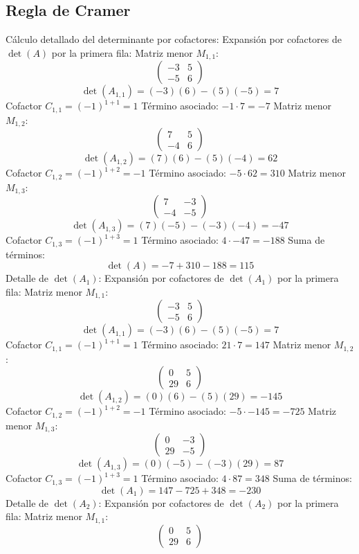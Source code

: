 \documentclass{article}
\begin{document}
\subsection*{Regla de Cramer}
Cálculo detallado del determinante por cofactores:
Expansión por cofactores de $\det(A)$ por la primera fila:
Matriz menor $M_{1,1}$:
\[\begin{pmatrix}-3 & 5 \\ -5 & 6\end{pmatrix}\]
\[\det(A_{1,1}) = (-3)(6) - (5)(-5) = 7\]
Cofactor $C_{1,1} = (-1)^{1+1} = 1$
Término asociado: $ -1 \cdot 7 = -7 $
Matriz menor $M_{1,2}$:
\[\begin{pmatrix}7 & 5 \\ -4 & 6\end{pmatrix}\]
\[\det(A_{1,2}) = (7)(6) - (5)(-4) = 62\]
Cofactor $C_{1,2} = (-1)^{1+2} = -1$
Término asociado: $ -5 \cdot 62 = 310 $
Matriz menor $M_{1,3}$:
\[\begin{pmatrix}7 & -3 \\ -4 & -5\end{pmatrix}\]
\[\det(A_{1,3}) = (7)(-5) - (-3)(-4) = -47\]
Cofactor $C_{1,3} = (-1)^{1+3} = 1$
Término asociado: $ 4 \cdot -47 = -188 $
Suma de términos:
\[\det(A) = -7 + 310 - 188 = 115\]
Detalle de $\det(A_{1})$:
Expansión por cofactores de $\det(A_{1})$ por la primera fila:
Matriz menor $M_{1,1}$:
\[\begin{pmatrix}-3 & 5 \\ -5 & 6\end{pmatrix}\]
\[\det(A_{1,1}) = (-3)(6) - (5)(-5) = 7\]
Cofactor $C_{1,1} = (-1)^{1+1} = 1$
Término asociado: $ 21 \cdot 7 = 147 $
Matriz menor $M_{1,2}$:
\[\begin{pmatrix}0 & 5 \\ 29 & 6\end{pmatrix}\]
\[\det(A_{1,2}) = (0)(6) - (5)(29) = -145\]
Cofactor $C_{1,2} = (-1)^{1+2} = -1$
Término asociado: $ -5 \cdot -145 = -725 $
Matriz menor $M_{1,3}$:
\[\begin{pmatrix}0 & -3 \\ 29 & -5\end{pmatrix}\]
\[\det(A_{1,3}) = (0)(-5) - (-3)(29) = 87\]
Cofactor $C_{1,3} = (-1)^{1+3} = 1$
Término asociado: $ 4 \cdot 87 = 348 $
Suma de términos:
\[\det(A_{1}) = 147 - 725 + 348 = -230\]
Detalle de $\det(A_{2})$:
Expansión por cofactores de $\det(A_{2})$ por la primera fila:
Matriz menor $M_{1,1}$:
\[\begin{pmatrix}0 & 5 \\ 29 & 6\end{pmatrix}\]
\end{document}
